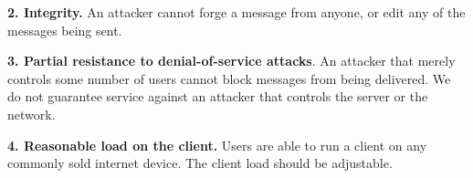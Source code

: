 \textbf{2. Integrity.} An attacker cannot forge a message from anyone, or edit any of the messages being sent.

\textbf{3. Partial resistance to denial-of-service attacks}. An attacker that merely controls some number of users cannot block messages from being delivered. We do not guarantee service against an attacker that controls the server or the network.

\textbf{4. Reasonable load on the client.} Users are able to run a client on any commonly sold internet device. The client load should be adjustable.

